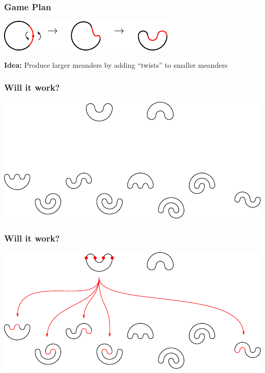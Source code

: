 \documentclass{beamer}
\begin{document}
\begin{frame}
\frametitle{Game Plan}
\begin{center}
\includegraphics[width=.8\textwidth]{meanders/1-into-2.pdf}
\end{center}
\pause
\textbf{Idea:} Produce larger meanders by adding ``twists'' to smaller meanders
\end{frame}

\begin{frame}
\frametitle{Will it work?}
\begin{center}
\includegraphics[width=\textwidth]{meanders/2-into-3_1.pdf}
\end{center}
\end{frame}

\begin{frame}
\frametitle{Will it work?}
\begin{center}
\includegraphics[width=\textwidth]{meanders/2-into-3_2.pdf}
\end{center}
\end{frame}
\end{document}
